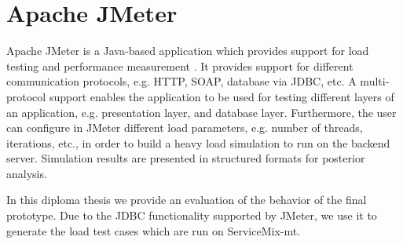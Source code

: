 \section{Apache JMeter}
\label{sec:jmeter}  

Apache JMeter is a Java-based application which provides support for load testing and performance measurement \cite{jmeter2013}. It provides support for different communication protocols, e.g. \ac{HTTP}, \ac{SOAP}, database via \ac{JDBC}, etc. A multi-protocol support enables the application to be used for testing different layers of an application, e.g. presentation layer, and database layer. Furthermore, the user can configure in JMeter different load parameters, e.g. number of threads, iterations, etc., in order to build a heavy load simulation to run on the backend server. Simulation results are presented in structured formats for posterior analysis. 

In this diploma thesis we provide an evaluation of the behavior of the final prototype. Due to the \ac{JDBC} functionality supported by JMeter, we use it to generate the load test cases which are run on ServiceMix-mt.

\FloatBarrier
